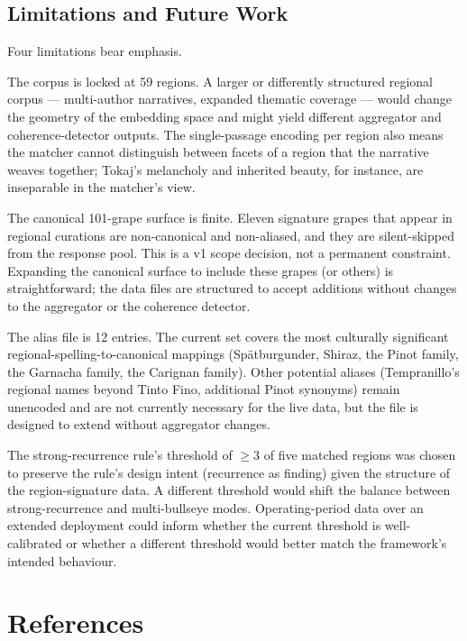 \documentclass[11pt]{article}
\begin{document}
\subsection{Limitations and Future Work}
Four limitations bear emphasis.

The corpus is locked at 59 regions. A larger or differently structured regional corpus --- multi-author narratives, expanded thematic coverage --- would change the geometry of the embedding space and might yield different aggregator and coherence-detector outputs. The single-passage encoding per region also means the matcher cannot distinguish between facets of a region that the narrative weaves together; Tokaj's melancholy and inherited beauty, for instance, are inseparable in the matcher's view.

The canonical 101-grape surface is finite. Eleven signature grapes that appear in regional curations are non-canonical and non-aliased, and they are silent-skipped from the response pool. This is a v1 scope decision, not a permanent constraint. Expanding the canonical surface to include these grapes (or others) is straightforward; the data files are structured to accept additions without changes to the aggregator or the coherence detector.

The alias file is 12 entries. The current set covers the most culturally significant regional-spelling-to-canonical mappings (Spätburgunder, Shiraz, the Pinot family, the Garnacha family, the Carignan family). Other potential aliases (Tempranillo's regional names beyond Tinto Fino, additional Pinot synonyms) remain unencoded and are not currently necessary for the live data, but the file is designed to extend without aggregator changes.

The strong-recurrence rule's threshold of $\geq 3$ of five matched regions was chosen to preserve the rule's design intent (recurrence as finding) given the structure of the region-signature data. A different threshold would shift the balance between strong-recurrence and multi-bullseye modes. Operating-period data over an extended deployment could inform whether the current threshold is well-calibrated or whether a different threshold would better match the framework's intended behaviour.

\section*{References}
\end{document}

